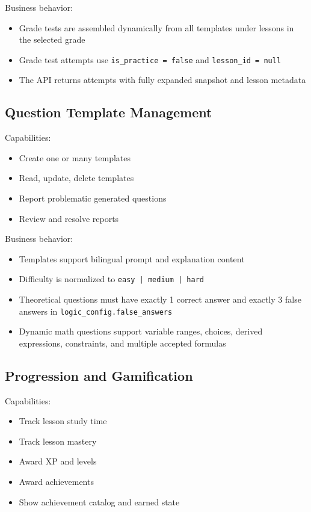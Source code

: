 \documentclass[11pt,a4paper]{article}
\newcommand{\docpath}[1]{\texttt{#1}}
\begin{document}
Business behavior:
\begin{itemize}[leftmargin=1.5em]
  \item Grade tests are assembled dynamically from all templates under lessons in the selected grade
  \item Grade test attempts use \docpath{is\_practice = false} and \docpath{lesson\_id = null}
  \item The API returns attempts with fully expanded snapshot and lesson metadata
\end{itemize}

\subsection{Question Template Management}

Capabilities:
\begin{itemize}[leftmargin=1.5em]
  \item Create one or many templates
  \item Read, update, delete templates
  \item Report problematic generated questions
  \item Review and resolve reports
\end{itemize}

Business behavior:
\begin{itemize}[leftmargin=1.5em]
  \item Templates support bilingual prompt and explanation content
  \item Difficulty is normalized to \docpath{easy | medium | hard}
  \item Theoretical questions must have exactly 1 correct answer and exactly 3 false answers in \docpath{logic\_config.false\_answers}
  \item Dynamic math questions support variable ranges, choices, derived expressions, constraints, and multiple accepted formulas
\end{itemize}

\subsection{Progression and Gamification}

Capabilities:
\begin{itemize}[leftmargin=1.5em]
  \item Track lesson study time
  \item Track lesson mastery
  \item Award XP and levels
  \item Award achievements
  \item Show achievement catalog and earned state
\end{itemize}
\end{document}
